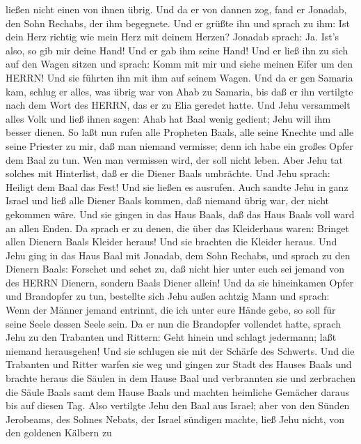 ließen nicht einen von ihnen übrig.  Und da er von dannen
zog, fand er Jonadab, den Sohn Rechabs, der ihm begegnete. Und er grüßte
ihn und sprach zu ihm: Ist dein Herz richtig wie mein Herz mit deinem
Herzen? Jonadab sprach: Ja. Ist's also, so gib mir deine Hand! Und er
gab ihm seine Hand! Und er ließ ihn zu sich auf den Wagen sitzen
 und sprach: Komm mit mir und siehe meinen Eifer um den
HERRN! Und sie führten ihn mit ihm auf seinem Wagen.  Und
da er gen Samaria kam, schlug er alles, was übrig war von Ahab zu
Samaria, bis daß er ihn vertilgte nach dem Wort des HERRN, das er zu
Elia geredet hatte.  Und Jehu versammelt alles Volk und
ließ ihnen sagen: Ahab hat Baal wenig gedient; Jehu will ihm besser
dienen.  So laßt nun rufen alle Propheten Baals, alle seine
Knechte und alle seine Priester zu mir, daß man niemand vermisse; denn
ich habe ein großes Opfer dem Baal zu tun. Wen man vermissen wird, der
soll nicht leben. Aber Jehu tat solches mit Hinterlist, daß er die
Diener Baals umbrächte.  Und Jehu sprach: Heiligt dem Baal
das Fest! Und sie ließen es ausrufen.  Auch sandte Jehu in
ganz Israel und ließ alle Diener Baals kommen, daß niemand übrig war,
der nicht gekommen wäre. Und sie gingen in das Haus Baals, daß das Haus
Baals voll ward an allen Enden.  Da sprach er zu denen, die
über das Kleiderhaus waren: Bringet allen Dienern Baals Kleider heraus!
Und sie brachten die Kleider heraus.  Und Jehu ging in das
Haus Baal mit Jonadab, dem Sohn Rechabs, und sprach zu den Dienern
Baals: Forschet und sehet zu, daß nicht hier unter euch sei jemand von
des HERRN Dienern, sondern Baals Diener allein!  Und da sie
hineinkamen Opfer und Brandopfer zu tun, bestellte sich Jehu außen
achtzig Mann und sprach: Wenn der Männer jemand entrinnt, die ich unter
eure Hände gebe, so soll für seine Seele dessen Seele sein.
 Da er nun die Brandopfer vollendet hatte, sprach Jehu zu
den Trabanten und Rittern: Geht hinein und schlagt jedermann; laßt
niemand herausgehen! Und sie schlugen sie mit der Schärfe des Schwerts.
Und die Trabanten und Ritter warfen sie weg und gingen zur Stadt des
Hauses Baals  und brachte heraus die Säulen in dem Hause
Baal und verbrannten sie  und zerbrachen die Säule Baals
samt dem Hause Baals und machten heimliche Gemächer daraus bis auf
diesen Tag.  Also vertilgte Jehu den Baal aus Israel;
 aber von den Sünden Jerobeams, des Sohnes Nebats, der
Israel sündigen machte, ließ Jehu nicht, von den goldenen Kälbern zu

